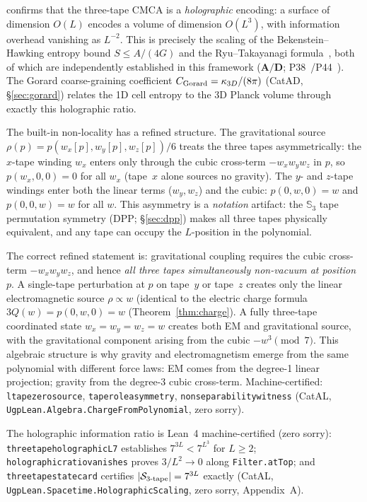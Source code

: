 \documentclass[11pt]{article}
\theoremstyle{remark}
\newcommand{\lean}[1]{%
  \penalty-100
  \begingroup\def\_{\textunderscore\allowbreak}\texttt{#1}\endgroup}
\newcommand{\CatAD}{\textbf{A/D}}
\begin{document}


\noindent confirms that the three-tape CMCA is a \emph{holographic} encoding: a surface of
dimension $O(L)$ encodes a volume of dimension $O(L^3)$, with information overhead
vanishing as $L^{-2}$. This is precisely the scaling of the Bekenstein--Hawking entropy
bound $S \leq A/(4G)$ and the Ryu--Takayanagi formula~\cite{Ryu2006}, both of
which are independently established in this framework ($\CatAD$; P38~\cite{SpivackPhiMDLGravity}/P44~\cite{SpivackQGR}). The Gorard
coarse-graining coefficient $C_{\rm Gorard} = \kappa_{3D}/(8\pi)$ (CatAD, \S\ref{sec:gorard})
relates the 1D cell entropy to the 3D Planck volume through exactly this holographic ratio.

The built-in non-locality has a refined structure. The gravitational source
$\rho(p) = p(w_x[p], w_y[p], w_z[p])/6$ treats the three tapes asymmetrically:
the $x$-tape winding $w_x$ enters only through the cubic cross-term $-w_x w_y w_z$
in $p$, so $p(w_x, 0, 0) = 0$ for all $w_x$ (tape~$x$ alone sources no gravity).
The $y$- and $z$-tape windings enter both the linear terms ($w_y, w_z$) and the
cubic: $p(0, w, 0) = w$ and $p(0, 0, w) = w$ for all $w$.
This asymmetry is a \emph{notation} artifact: the $\mathbb{S}_3$ tape permutation
symmetry (DPP; \S\ref{sec:dpp}) makes all three tapes physically equivalent, and
any tape can occupy the $L$-position in the polynomial.

The correct refined statement is: gravitational coupling requires the cubic
cross-term $-w_x w_y w_z$, and hence \emph{all three tapes simultaneously non-vacuum
at position $p$}. A single-tape perturbation at $p$ on tape~$y$ or tape~$z$ creates
only the linear electromagnetic source $\rho \propto w$ (identical to the electric
charge formula $3Q(w) = p(0,w,0) = w$ (Theorem~\ref{thm:charge}).
A fully three-tape coordinated state $w_x=w_y=w_z=w$ creates both EM and
gravitational source, with the gravitational component arising from the cubic
$-w^3 \pmod 7$. This algebraic structure is why gravity and
electromagnetism emerge from the same polynomial with different force laws:
EM comes from the degree-1 linear projection; gravity from the degree-3 cubic
cross-term. Machine-certified: \lean{l\_tape\_zero\_source},
\lean{tape\_role\_asymmetry}, \lean{non\_separability\_witness}
(CatAL, \lean{UgpLean.Algebra.ChargeFromPolynomial}, zero sorry).

The holographic information ratio is Lean~4 machine-certified (zero sorry):
\lean{three\_tape\_holographic\_L7} establishes $7^{3L} < 7^{L^3}$ for $L\geq 2$;
\lean{holographic\_ratio\_vanishes} proves $3/L^2 \to 0$ along \lean{Filter.atTop};
and \lean{three\_tape\_state\_card} certifies $|\mathcal{S}_{\rm 3\text{-}tape}| = 7^{3L}$
exactly (CatAL, \lean{UgpLean.Spacetime.HolographicScaling}, zero sorry,
Appendix~A).
\end{document}
